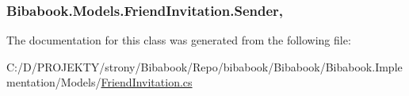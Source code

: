 \subsubsection[{Sender}]{ Bibabook.\+Models.\+Friend\+Invitation.\+Sender\hspace{0.3cm}{\ttfamily [get]}, {\ttfamily [set]}}\label{class_bibabook_1_1_models_1_1_friend_invitation_acbafc27ba0a33d21f303eacd3f6364dd}


The documentation for this class was generated from the following file\+:\begin{DoxyCompactItemize}
\item 
C\+:/\+D/\+P\+R\+O\+J\+E\+K\+T\+Y/strony/\+Bibabook/\+Repo/bibabook/\+Bibabook/\+Bibabook.\+Implementation/\+Models/\hyperlink{_friend_invitation_8cs}{Friend\+Invitation.\+cs}\end{DoxyCompactItemize}
